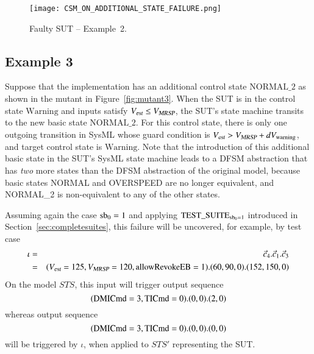  
 \begin{figure}
 \hspace*{-20mm}
\texttt{[image: CSM\_ON\_ADDITIONAL\_STATE\_FAILURE.png]}
\caption{Faulty SUT -- Example~2.}
 \label{fig:addstatefail}
 \end{figure}





\subsection{Example 3}\label{sec:example3}

Suppose that the implementation has an additional  control state $\text{NORMAL\_2}$ as
shown in the mutant in Figure~\ref{fig:mutant3}. When the SUT is in the control state $\text{Warning} $ and inputs satisfy ${V_{\text{\sl est}}}\le {V_{\text{\sl MRSP}}}$, the SUT's state machine transits to the new basic state  
$\text{NORMAL\_2}$. For this control state, there is only one outgoing transition in SysML whose guard condition is $ {V_{\text{\sl est}}} > {V_{\text{\sl MRSP}}} + dV_{\text {warning}}$, and target control state is $\text {Warning}$.
Note that the introduction of this additional basic state in the SUT's SysML state machine leads to a DFSM abstraction that has {\it two} more states than the DFSM abstraction of the original model, because basic states {\sf NORMAL} and {\sf OVERSPEED} are no longer equivalent, and {\sf NORMAL\_2} is non-equivalent to any of the other states.


Assuming again the case $\text{sb}_0=1$ and applying $\text{TEST\_SUITE}_{\text{sb}_0=1}$ introduced in Section~\ref{sec:completesuites}, this failure will be uncovered, for example, by test case
\footnotesize
\begin{eqnarray*}
\iota & = & \vec c_4.\vec c_1.\vec c_3 
\\ & = & ({V_{\text{\sl est}}}=125,{V_{\text{\sl MRSP}}}=120,\text{allowRevokeEB}=1).(60,90,0).(152,150,0)
\end{eqnarray*}
\normalsize
On the model $STS$, this input will trigger output sequence
$$
(\text{DMICmd}=3,\text{TICmd}=0).(0,0).(2,0)
$$
whereas output sequence
$$
(\text{DMICmd}=3,\text{TICmd}=0).(0,0).(0,0)
$$
will be triggered by $\iota$, when applied to $STS'$ representing the SUT. 


